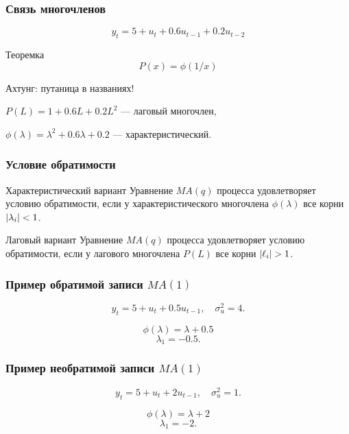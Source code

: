\begin{frame}
    \frametitle{Связь многочленов}

    \[
        y_t = 5 + u_t + 0.6u_{t-1} + 0.2u_{t-2}
    \]

    \begin{block}{Теоремка}
        \[
        P(x) = \phi(1/x)    
        \]
    \end{block}

    \pause
    Ахтунг: \alert{путаница} в названиях!

    $P(L)= 1 + 0.6 L + 0.2 L^2$ — \alert{лаговый} многочлен,

    $\phi(\lambda) = \lambda^2 + 0.6 \lambda + 0.2$ — \alert{характеристический}.


\end{frame}



\begin{frame}
    \frametitle{Условие обратимости}

    \begin{block}{Характеристический вариант}
        Уравнение $MA(q)$ процесса удовлетворяет условию обратимости, если 
        у характеристического многочлена $\phi(\lambda)$ все корни $\abs{\lambda_i} <1$.
    \end{block}

    \pause

    \begin{block}{Лаговый вариант}
        Уравнение $MA(q)$ процесса удовлетворяет условию обратимости, если 
        у лагового многочлена $P(L)$ все корни $\abs{\ell_i} >1$.
    \end{block}
    

\end{frame}

\begin{frame}
    \frametitle{Пример обратимой записи $MA(1)$}

    \[
        y_t = 5 + u_t + 0.5 u_{t-1}, \quad \sigma^2_u = 4.
    \]
    \pause

    \[
    \phi(\lambda) = \lambda + 0.5    
    \]
    \pause
    \[
    \lambda_1 = -0.5.    
    \]

\end{frame}


\begin{frame}
    \frametitle{Пример необратимой записи $MA(1)$}

    \[
        y_t = 5 + u_t + 2 u_{t-1}, \quad \sigma^2_u = 1.
    \]
    \pause

    \[
    \phi(\lambda) = \lambda + 2    
    \]
    \pause
    \[
    \lambda_1 = -2.    
    \]
\end{frame}


